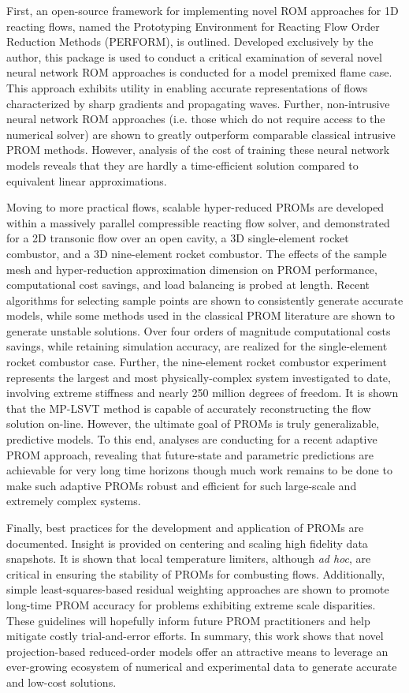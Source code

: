 First, an open-source framework for implementing novel ROM approaches for 1D reacting flows, named the Prototyping Environment for Reacting Flow Order Reduction Methods (PERFORM), is outlined. Developed exclusively by the author, this package is used to conduct a critical examination of several novel neural network ROM approaches is conducted for a model premixed flame case. This approach exhibits utility in enabling accurate representations of flows characterized by sharp gradients and propagating waves. Further, non-intrusive neural network ROM approaches (i.e. those which do not require access to the numerical solver) are shown to greatly outperform comparable classical intrusive PROM methods. However, analysis of the cost of training these neural network models reveals that they are hardly a time-efficient solution compared to equivalent linear approximations.

Moving to more practical flows, scalable hyper-reduced PROMs are developed within a massively parallel compressible reacting flow solver, and demonstrated for a 2D transonic flow over an open cavity, a 3D single-element rocket combustor, and a 3D nine-element rocket combustor. The effects of the sample mesh and hyper-reduction approximation dimension on PROM performance, computational cost savings, and load balancing is probed at length. Recent algorithms for selecting sample points are shown to consistently generate accurate models, while some methods used in the classical PROM literature are shown to generate unstable solutions. Over four orders of magnitude computational costs savings, while retaining simulation accuracy, are realized for the single-element rocket combustor case. Further, the nine-element rocket combustor experiment represents the largest and most physically-complex system investigated to date, involving extreme stiffness and nearly 250 million degrees of freedom. It is shown that the MP-LSVT method is capable of accurately reconstructing the flow solution on-line. However, the ultimate goal of PROMs is truly generalizable, predictive models. To this end, analyses are conducting for a recent adaptive PROM approach, revealing that future-state and parametric predictions are achievable for very long time horizons though much work remains to be done to make such adaptive PROMs robust and efficient for such large-scale and extremely complex systems.

Finally, best practices for the development and application of PROMs are documented. Insight is provided on  centering and scaling high fidelity data snapshots. It is shown that local temperature limiters, although \textit{ad hoc}, are critical in ensuring the stability of PROMs for combusting flows. Additionally, simple least-squares-based residual weighting approaches are shown to promote long-time PROM accuracy for problems exhibiting extreme scale disparities. These guidelines will hopefully inform future PROM practitioners and help mitigate costly trial-and-error efforts. In summary, this work shows that novel projection-based reduced-order models offer an attractive means to leverage an ever-growing ecosystem of numerical and experimental data to generate accurate and low-cost solutions.